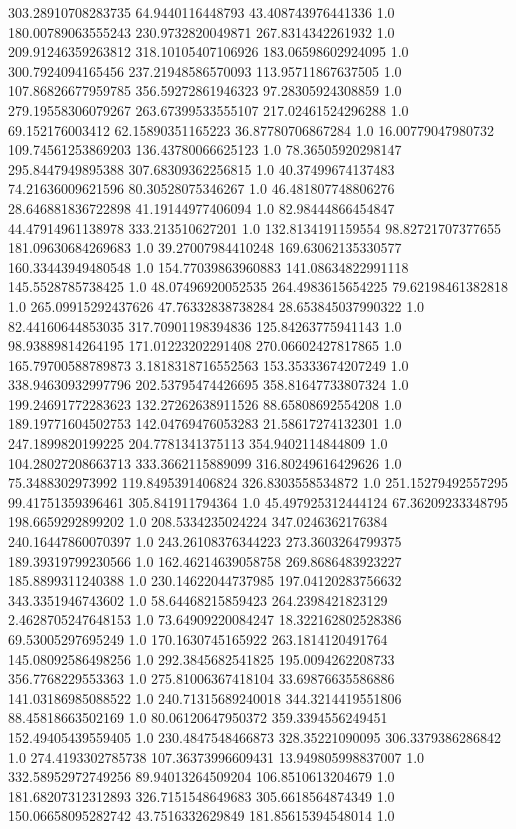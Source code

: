 303.28910708283735	64.9440116448793	43.408743976441336	1.0
180.00789063555243	230.9732820049871	267.8314342261932	1.0
209.91246359263812	318.10105407106926	183.06598602924095	1.0
300.7924094165456	237.21948586570093	113.95711867637505	1.0
107.86826677959785	356.59272861946323	97.28305924308859	1.0
279.19558306079267	263.67399533555107	217.02461524296288	1.0
69.152176003412	62.15890351165223	36.87780706867284	1.0
16.00779047980732	109.74561253869203	136.43780066625123	1.0
78.36505920298147	295.8447949895388	307.68309362256815	1.0
40.37499674137483	74.21636009621596	80.30528075346267	1.0
46.481807748806276	28.646881836722898	41.19144977406094	1.0
82.98444866454847	44.47914961138978	333.213510627201	1.0
132.8134191159554	98.82721707377655	181.09630684269683	1.0
39.27007984410248	169.63062135330577	160.33443949480548	1.0
154.77039863960883	141.08634822991118	145.5528785738425	1.0
48.07496920052535	264.4983615654225	79.62198461382818	1.0
265.09915292437626	47.76332838738284	28.653845037990322	1.0
82.44160644853035	317.70901198394836	125.84263775941143	1.0
98.93889814264195	171.01223202291408	270.06602427817865	1.0
165.79700588789873	3.1818318716552563	153.35333674207249	1.0
338.94630932997796	202.53795474426695	358.81647733807324	1.0
199.24691772283623	132.27262638911526	88.65808692554208	1.0
189.19771604502753	142.04769476053283	21.58617274132301	1.0
247.1899820199225	204.7781341375113	354.9402114844809	1.0
104.28027208663713	333.3662115889099	316.80249616429626	1.0
75.3488302973992	119.8495391406824	326.8303558534872	1.0
251.15279492557295	99.41751359396461	305.841911794364	1.0
45.497925312444124	67.36209233348795	198.6659292899202	1.0
208.5334235024224	347.0246362176384	240.16447860070397	1.0
243.26108376344223	273.3603264799375	189.39319799230566	1.0
162.46214639058758	269.8686483923227	185.8899311240388	1.0
230.14622044737985	197.04120283756632	343.3351946743602	1.0
58.64468215859423	264.2398421823129	2.4628705247648153	1.0
73.64909220084247	18.322162802528386	69.53005297695249	1.0
170.1630745165922	263.1814120491764	145.08092586498256	1.0
292.3845682541825	195.0094262208733	356.7768229553363	1.0
275.81006367418104	33.69876635586886	141.03186985088522	1.0
240.71315689240018	344.3214419551806	88.45818663502169	1.0
80.06120647950372	359.3394556249451	152.49405439559405	1.0
230.4847548466873	328.35221090095	306.3379386286842	1.0
274.4193302785738	107.36373996609431	13.949805998837007	1.0
332.58952972749256	89.94013264509204	106.8510613204679	1.0
181.68207312312893	326.7151548649683	305.6618564874349	1.0
150.06658095282742	43.7516332629849	181.85615394548014	1.0

